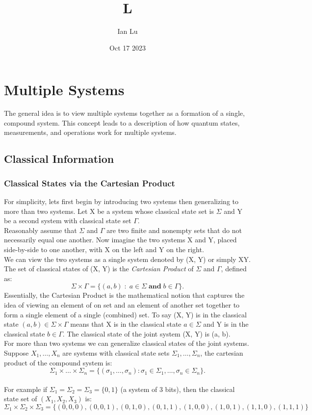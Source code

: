 \documentclass[11pt]{scrartcl}
\title{L}
\author{Ian Lu}
\date{Oct 17 2023}
\begin{document}
\title{}
\section{Multiple Systems}
The general idea is to view multiple systems together as a formation of a single, compound system. This concept 
leads to a description of how quantum states, measurements, and operations work for multiple systems.
\subsection{Classical Information}
\subsubsection{Classical States via the Cartesian Product}
For simplicity, lets first begin by introducing two systems then generalizing to more than two systems.
Let X be a system whose classical state set is $\Sigma$ and Y be a second system with classical state set $\Gamma$.
\vspace{5mm}\\
Reasonably assume that $\Sigma$ and $\Gamma$ are two finite and nonempty sets that do not necessarily equal one another.
Now imagine the two systems X and Y, placed side-by-side to one another, with X on the left and Y on the right. 
\vspace{5mm}\\We can view the two systems
as a single system denoted by (X, Y) or simply XY. The set of classical states of (X, Y) is the \textit{Cartesian Product} of 
$\Sigma$ and $\Gamma$, defined as:
$$\Sigma \times \Gamma = \{(a, b) \; : \; a\in\Sigma \; \textbf{and} \; b\in\Gamma \}.$$
Essentially, the Cartesian Product is the mathematical notion that captures the idea of viewing an element of on set and an element of another set together to 
form a single element of a single (combined) set. 
To say (X, Y) is in the classical state $(a, b)\in\Sigma \times \Gamma$ means that X is in the classical state $a\in\Sigma$ and Y is in the classical state
$b\in\Gamma$. The classical state of the joint system (X, Y) is (a, b).
\vspace{5mm}\\For more than two systems we can generalize classical states of the joint systems. Suppose $X_1, \dots ,X_n$ are systems with classical state sets
$\Sigma_1, \dots ,\Sigma_n$, the cartesian product of the compound system is: $$\Sigma_1 \times \dots \times \Sigma_n = \{ (\sigma_1, \dots, \sigma_n) : \sigma_1 \in \Sigma_1, \dots, \sigma_n \in \Sigma_n \}.
$$ \vspace{-5mm}
\vspace{5mm}\\For example if $\Sigma_1 = \Sigma_2 = \Sigma_3 = \{0, 1\}$ (a system of 3 bits), then the classical state 
set of $(X_1, X_2, X_3)$ is: 
$$\Sigma_1 \times \Sigma_2 \times \Sigma_3 = \{ (0,0,0), (0,0,1), (0,1,0), (0,1,1), (1,0,0), (1,0,1), (1,1,0), (1,1,1) \}$$
\end{document}
